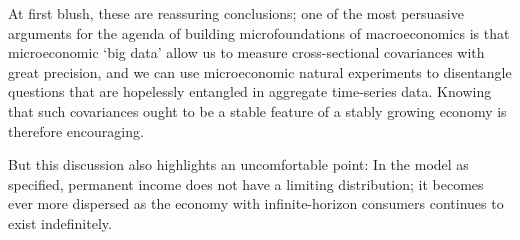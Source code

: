 \documentclass[BufferStockTheory]{subfiles}
\begin{document}
\begin{comment}
which is the point where $\HarmWide{\cv}_{t}$ is the covariance calculated according to the Harmenberg measure.

As Harmenberg points out, a convenient feature of his measure is that $\Harm{\Mean}_{t+n}[\pLevBF_{t+n}]=\PGro^{n}$.  Using this, if by date $t=0$ the economy had achieved a Harmenberg-invariant state then we could define $\bar{\cRat}=\Harm{\Mean}_{t}[\cRat_ {t}]$ and use the fact that thereafter assets grow at the constant rate $\PGro$ to obtain
  \begin{align}
  \CLevBF_{t+1} & = \PGro \CLevBF_{t}\notag \\ 
  \bar{\cRat}\PGro +\HarmWide{\cv}(\cRat_{t+1},\pLevBF_{t+1})   & = \PGro \left( \bar{\cRat}  +  \HarmWide{\cv}(\cRat_{t},\pLevBF_{t})\right) \label{eq:covProblem} 
\\  \HarmWide{\cv}(\cRat_{t+1},\pLevBF_{t+1})   & = \HarmWide{\cv}(\cRat_{t},\pLevBF_{t})  \notag
\end{align}

A corresponding argument shows that $\cov(\mRat,\pLevBF)$ also grows by $\PGro$.
\end{comment}


\hypertarget{microfounding-macro-needs-ergodicity}{}
At first blush, these are reassuring conclusions; one of the most persuasive arguments for the agenda of building microfoundations of macroeconomics is that microeconomic `big data' allow us to measure cross-sectional covariances with great precision, and we can use microeconomic natural experiments to disentangle questions that are hopelessly entangled in aggregate time-series data.  Knowing that such covariances ought to be a stable feature of a stably growing economy is therefore encouraging.


But this discussion also highlights an uncomfortable point: In the model as specified, permanent income does not have a limiting distribution; it becomes ever more dispersed as the economy with infinite-horizon consumers continues to exist indefinitely.
\end{document}
